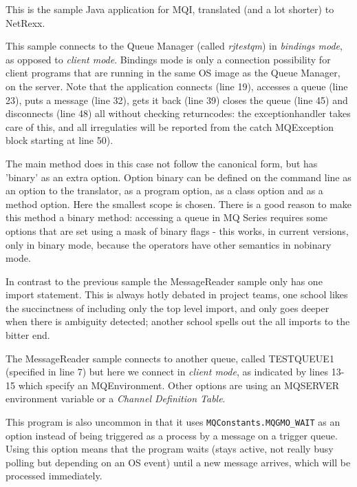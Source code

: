 {{This is the sample Java application for MQI, translated (and a lot
shorter) to NetRexx.

This sample connects to the Queue Manager (called \emph{rjtestqm}) in
\emph{bindings mode}, as opposed to \emph{client mode}. Bindings mode
is only a connection possibility for client programs that are running
in the same OS image as the Queue Manager, on the server. Note that
the application connects (line 19), accesses a queue (line 23), puts a
message (line 32), gets it back (line 39) closes the queue (line 45) and disconnects (line 48) all without checking
returncodes: the exceptionhandler takes care of this, and all
irregulaties will be reported from the catch MQException block
starting at line 50).

The main method does in this case not follow the canonical form, but
has 'binary' as an extra option. Option binary can be defined on the
command line as an option to the translator, as a program option, as a
class option and as a method option. Here the smallest scope is
chosen. There is a good reason to make this method a binary method:
accessing a queue in MQ Series requires some options that are set
using a mask of binary flags - this works, in current \nr{} versions,
only in binary mode, because the operators have other semantics in
nobinary mode.


In contrast to the previous sample the MessageReader sample only has
one import statement. This is always hotly debated in project teams,
one school likes the succinctness of including only the top level
import, and only goes deeper when there is ambiguity detected; another
school spells out the all imports to the bitter end. 

The MessageReader sample connects to another queue, called TESTQUEUE1
(specified in line 7) but here we connect in \emph{client mode}, as
indicated by lines 13-15 which specify an MQEnvironment. Other
options are using an MQSERVER environment variable or a \emph{Channel
Definition Table}.

This program is also uncommon in that it uses
\texttt{MQConstants.MQGMO\_WAIT} as an option instead of being
triggered as a process by a message on a trigger queue. Using this
option means that the program waits (stays active, not really busy polling
but depending on an OS event) until a new
message arrives, which will be processed immediately.

}}
